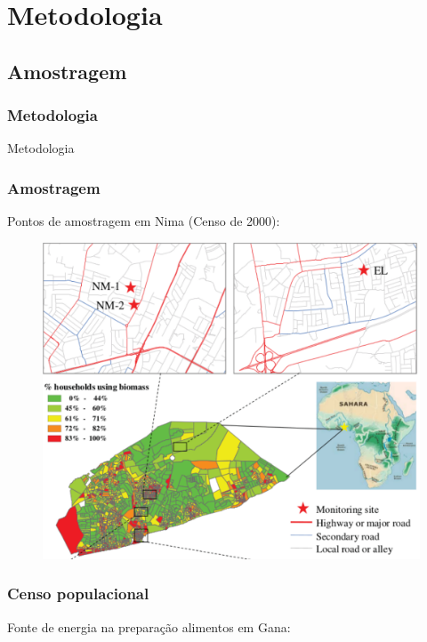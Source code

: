 \section{Metodologia}

\subsection{Amostragem}

\begin{frame}
	\frametitle{Metodologia}
	\begin{center}
		\Huge
		Metodologia
	\end{center}
\end{frame}

\begin{frame}
  \frametitle{Amostragem}
 \begin{center}
  Pontos de amostragem em Nima (Censo de 2000):
 \end{center}
  \begin{figure}[H]
    \centering
    \includegraphics[scale=0.35]{../../inputs/images/zheng/nima_mapa.pdf}
  \end{figure}
\end{frame}

\begin{frame}
  \frametitle{Censo populacional}
\begin{center}
  Fonte de energia na preparação alimentos em Gana:
\end{center}
  \begin{table}[H]
  	\centering
  	
  \end{table}
\end{frame}

